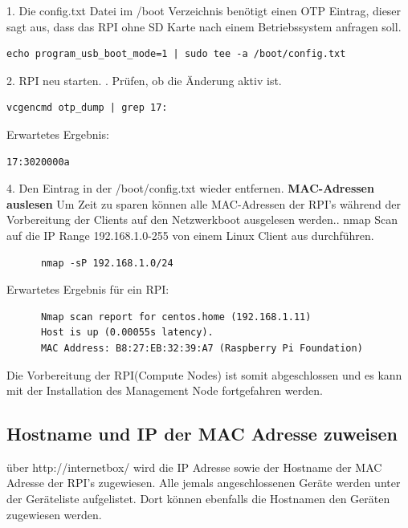 1. Die config.txt Datei im /boot Verzeichnis benötigt einen OTP Eintrag, dieser sagt aus, dass das RPI ohne SD Karte nach einem Betriebssystem anfragen soll. 
\begin{lstlisting}
echo program_usb_boot_mode=1 | sudo tee -a /boot/config.txt
\end{lstlisting}
2. RPI neu starten. . Prüfen, ob die Änderung aktiv ist.
\begin{lstlisting}
vcgencmd otp_dump | grep 17:
\end{lstlisting}
Erwartetes Ergebnis:
\begin{lstlisting}
17:3020000a
\end{lstlisting}
4. Den Eintrag in der /boot/config.txt wieder entfernen.\newline
\textbf{MAC-Adressen auslesen}\newline
Um Zeit zu sparen können alle MAC-Adressen der RPI's während der Vorbereitung der Clients auf den Netzwerkboot ausgelesen werden.. nmap Scan auf die IP Range 192.168.1.0-255 von einem Linux Client aus durchführen.
\begin{lstlisting}
	  nmap -sP 192.168.1.0/24  
\end{lstlisting}
Erwartetes Ergebnis für ein RPI:
\begin{lstlisting}
	  Nmap scan report for centos.home (192.168.1.11)
	  Host is up (0.00055s latency).
	  MAC Address: B8:27:EB:32:39:A7 (Raspberry Pi Foundation)   
\end{lstlisting}

Die Vorbereitung der RPI(Compute Nodes) ist somit abgeschlossen und es kann mit der Installation des Management Node fortgefahren werden.

\subsection{Hostname und IP der MAC Adresse zuweisen}
über http://internetbox/ wird die IP Adresse sowie der Hostname der MAC Adresse der RPI's zugewiesen. Alle jemals angeschlossenen Geräte werden unter der Geräteliste aufgelistet. Dort können ebenfalls die Hostnamen den Geräten zugewiesen werden.

